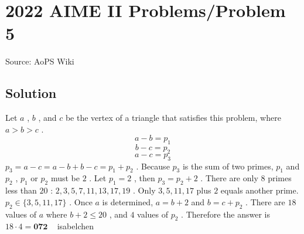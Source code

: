 \documentclass[12pt]{article}
\begin{document}
\section*{{2022 AIME II Problems/Problem 5}}
Source: AoPS Wiki

\subsection*{Solution}
Let $a$ , $b$ , and $c$ be the vertex of a triangle that satisfies this problem, where $a > b > c$ . \[a - b = p_1\] \[b - c = p_2\] \[a - c = p_3\] $p_3 = a - c = a - b + b - c = p_1 + p_2$ . Because $p_3$ is the sum of two primes, $p_1$ and $p_2$ , $p_1$ or $p_2$ must be $2$ . Let $p_1 = 2$ , then $p_3 = p_2 + 2$ . There are only $8$ primes less than $20$ : $2, 3, 5, 7, 11, 13, 17, 19$ . Only $3, 5, 11, 17$ plus $2$ equals another prime. $p_2 \in \{ 3, 5, 11, 17 \}$ . Once $a$ is determined, $a = b+2$ and $b = c + p_2$ . There are $18$ values of $a$ where $b+2 \le 20$ , and $4$ values of $p_2$ . Therefore the answer is $18 \cdot 4 = \boxed{\textbf{072}}$ ~ isabelchen
\end{document}
